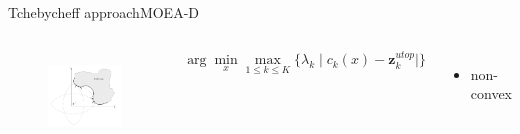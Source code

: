\begin{frame}{Tchebycheff approach}{MOEA-D}
	\begin{columns}
		\begin{figure}
			\centering
			\includegraphics[width=\linewidth]{figure/tchebycheff}
			\label{fig:tchebycheff}
		\end{figure}
		\begin{minipage}{\textwidth}
            \begin{equation}
			\nonumber
			\arg\min_x \max_{1 \leq k \leq K}  \{ \lambda_{k} \mid c_{k}(x) - \bm{z}^{utop}_{k}  | \} 
			\end{equation}
			\begin{itemize}
				\item non-convex
			\end{itemize}
		\end{minipage}
	\end{columns}
\end{frame}

